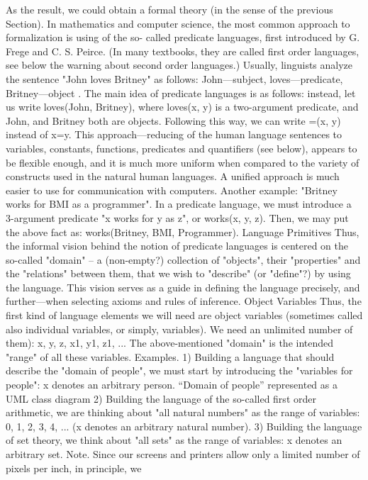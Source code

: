 As the result, we could obtain a formal theory (in the sense of the previous Section).
In mathematics and computer science, the most common approach to formalization is using of the so-
called predicate languages, first introduced by G. Frege and C. S. Peirce.
(In many textbooks, they are called first order languages, see below the warning about second order languages.)
Usually, linguists analyze the sentence "John loves Britney" as follows: John---subject, loves---predicate,
Britney---object . The main idea of predicate languages is as follows: instead, let us write loves(John,
Britney), where loves(x, y) is a two-argument predicate, and John, and Britney both are objects. Following
this way, we can write =(x, y) instead of x=y. This approach---reducing of the human language sentences
to variables, constants, functions, predicates and quantifiers (see below), appears to be flexible enough,
and it is much more uniform when compared to the variety of constructs used in the natural human
languages. A unified approach is much easier to use for communication with computers.
Another example: "Britney works for BMI as a programmer". In a predicate language, we must introduce a 3-argument
predicate "x works for y as z", or works(x, y, z). Then, we may put the above fact as: works(Britney, BMI, Programmer).
Language Primitives
Thus, the informal vision behind the notion of predicate languages is centered on the so-called "domain"
– a (non-empty?) collection of "objects", their "properties" and the "relations" between them, that we wish
to "describe" (or "define"?) by using the language. This vision serves as a guide in defining the language
precisely, and further---when selecting axioms and rules of inference.
Object Variables
Thus, the first kind of language elements we will need are object variables (sometimes called also
individual variables, or simply, variables). We need an unlimited number of them):
x, y, z, x1, y1, z1, ...
The above-mentioned "domain" is the intended "range" of all these variables.
Examples. 1) Building a language that should describe the "domain of people", we must start by introducing the "variables for
people": x denotes an arbitrary person.
``Domain of people'' represented as a UML class diagram
2) Building the language of the so-called first order arithmetic, we are thinking about "all natural numbers" as the range of
variables: 0, 1, 2, 3, 4, ... (x denotes an arbitrary natural number).
3) Building the language of set theory, we think about "all sets" as the range of variables: x denotes an arbitrary set.
Note. Since our screens and printers allow only a limited number of pixels per inch, in principle, we
